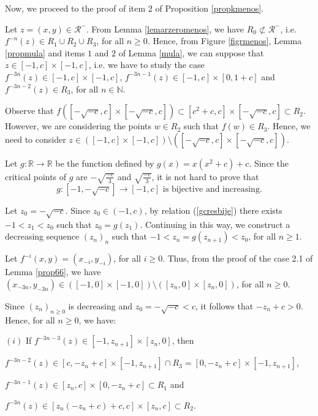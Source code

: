 \documentclass[11pt]{amsart}
\theoremstyle{definition}
\begin{document}
Now, we proceed to the proof of item $2$ of Proposition \ref{propkmenos}.

Let $z=(x,y)\in \mathcal{R}^-$. From Lemma \ref{lemarzeromenos}, we have $R_0\not\subset \mathcal{R}^-$, i.e. $f^{-n}(z)\in R_1\cup R_2\cup R_3$, for all $n\geq 0$. Hence, from Figure \ref{figrmenos}, Lemma \ref{propmula} and items $1$ and $2$ of Lemma \ref{mula}, we can suppose that $z\in [-1,c]\times[-1,c]$, i.e. we have to study the case
	$f^{-3n}(z)\in [-1,c]\times[-1,c]$, $f^{-3n-1}(z)\in
	[-1,c]\times[0,1+c]$ and $f^{-3n-2}(z)\in R_3$, for all
	$n\in\mathbb{N}$.
	
	Observe that $f([-\sqrt{-c},c]\times[-\sqrt{-c},c])\subset
	[c^2+c,c]\times [-\sqrt{-c},c]\subset R_2$. However, we are considering the points $w\in R_2$ such that $f(w)\in R_3$. Hence, we need to consider $z\in([-1,c]\times[-1,c])\setminus ([-\sqrt{-c},c]\times[-\sqrt{-c},c])$.
	
Let $g:\mathbb{R}\longrightarrow\mathbb{R}$ be the function defined by $g(x)=x(x^2+c)+c$. Since the critical points of $g$ are $-\sqrt{\frac{-c}{3}}$ and $\sqrt{\frac{-c}{3}}$, it is not hard to prove that 
\begin{equation} \label{gcresbije}
g:[-1,-\sqrt{-c}]\longrightarrow [-1,c] \textrm{ is bijective  and increasing.}
\end{equation}

	
	Let $z_0=-\sqrt{-c}$. Since $z_0\in(-1,c)$, by relation (\ref{gcresbije}) there exists $-1<z_1< z_0$ such that
	$z_0=g(z_1)$. Continuing in this way, we construct a decreasing sequence $(z_n)_n$ such that $-1<z_n=g(z_{n+1})<z_0$, for all $n\geq 1$.

	Let $f^{-i}(x,y)=(x_{-i},y_{-i})$, for all $i\geq 0$. Thus, from the proof of the case 2.1 of
	Lemma \ref{prop66}, we have $(x_{-3n},y_{-3n})\in
	([-1,0]\times[-1,0])\setminus ([z_n,0]\times [z_n,0])$, for all $n\geq 0$.
	
	Since $(z_n)_{n\geq 0}$ is decreasing and $z_0=-\sqrt{-c}<c$, it follows that
	$-z_n+c>0$. Hence, for all $n\geq0$, we have:

\smallskip	

	\noindent $(i)$ If $f^{-3n-3}(z)\in [-1,z_{n+1}]\times[z_n,0]$, then

\smallskip

\noindent $f^{-3n-2}(z)\in [c,-z_n+c]\times[-1,z_{n+1}]\cap R_3= [0,-z_n+c]\times[-1,z_{n+1}]$,

\noindent $f^{-3n-1}(z)\in [z_n,c]\times[0,-z_n+c] \subset R_1$ and

\noindent $f^{-3n}(z)\in [z_n(-z_n+c)+c,c]\times[z_n,c]\subset R_2$.
	
\end{document}
